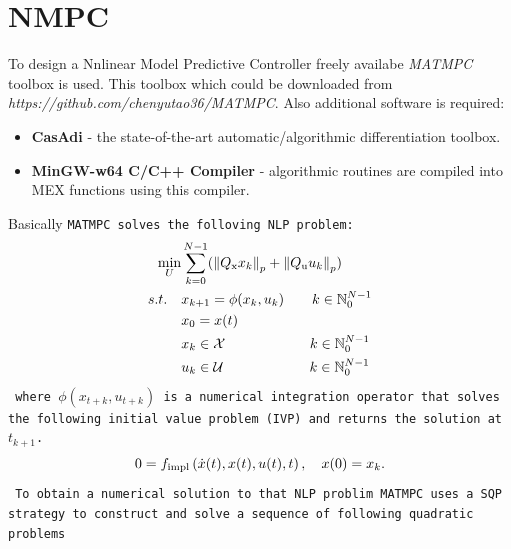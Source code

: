 \section{NMPC}
To design a Nnlinear Model Predictive Controller freely availabe \textit{MATMPC} toolbox is used. This toolbox which could be downloaded from \textit{https://github.com/chenyutao36/MATMPC}. Also additional software is required:
\begin{itemize}
	\item \textbf{CasAdi} - the state-of-the-art automatic/algorithmic differentiation toolbox.
	\item \textbf{MinGW-w64 C/C++ Compiler} - algorithmic routines are compiled
	into MEX functions using this compiler.
\end{itemize}
Basically \tt{MATMPC} solves the folloving NLP problem:
\begin{subequations}\label{NLP}
	\begin{align}
	\min_{U} &\sum_{k=0}^{N-1} (\left\| Q _{\text{x}}x_{k}\right\|_p+\left\|Q _{\text{u}}u_{k}\right\|_p)\\
	s.t.\quad&x_{k+1} = \phi(x_{k},u_{k})\qquad k \in \mathbb{N}_0^{N-1}\\
	&x_0 = x(t)\\
	&x_{k}\in\mathcal{X}\qquad\qquad\qquad\!\: k \in \mathbb{N}_0^{N-1}\\
	&u_{k}\in\mathcal{U}\qquad\qquad\qquad\, k \in \mathbb{N}_0^{N-1}
	\end{align}
\end{subequations}
where $\phi(x_{t+k},u_{t+k})$ is a numerical integration operator that solves the following initial value problem (IVP) and returns the solution at $t_{k+1}$.
\begin{equation}
0=f _{\text{impl}}\left( \dot{x}(t), x(t),u(t),t \right),\quad x(0)=x_k.
\end{equation}
To obtain a numerical solution to that NLP problim \tt{MATMPC} uses a SQP strategy to construct and solve a sequence of following quadratic problems
